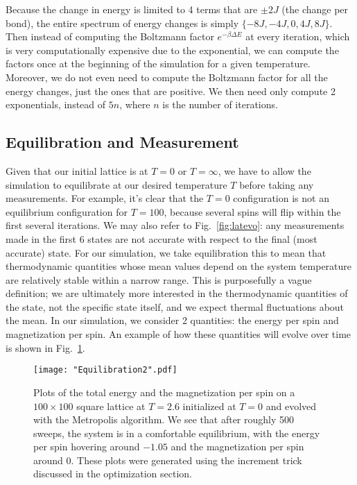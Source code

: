 \documentclass[twocolumn,aps,prl]{revtex4-1} %
\begin{document}
Because the change in energy is limited to 4 terms that are $\pm 2J$ (the change per bond), the entire spectrum of energy changes is simply $\{-8J, -4J, 0, 4J, 8J\}$. Then instead of computing the Boltzmann factor $e^{-\beta\Delta E}$ at every iteration, which is very computationally expensive due to the exponential, we can compute the factors once at the beginning of the simulation for a given temperature. Moreover, we do not even need to compute the Boltzmann factor for all the energy changes, just the ones that are positive. We then need only compute 2 exponentials, instead of $5n$, where $n$ is the number of iterations.

\subsection{Equilibration and Measurement}
Given that our initial lattice is at $T = 0$ or $T = \infty$, we have to allow the simulation to equilibrate at our desired temperature $T$ before taking any measurements. For example, it's clear that the $T = 0$ configuration is not an equilibrium configuration for $T = 100$, because several spins will flip within the first several iterations. We may also refer to Fig.~\ref{fig:latevo}: any measurements made in the first 6 states are not accurate with respect to the final (most accurate) state. For our simulation, we take equilibration this to mean that thermodynamic quantities whose mean values depend on the system temperature are relatively stable within a narrow range. This is purposefully a vague definition; we are ultimately more interested in the thermodynamic quantities of the state, not the specific state itself, and we expect thermal fluctuations about the mean. In our simulation, we consider 2 quantities: the energy per spin and magnetization per spin. An example of how these quantities will evolve over time is shown in Fig.~\ref{fig:equil}. 
\begin{figure}
	\texttt{[image: "Equilibration2".pdf]}
	\caption{\label{fig:equil}Plots of the total energy and the magnetization per spin on a $100 \times 100$ square lattice at $T = 2.6$ initialized at $T = 0$ and evolved with the Metropolis algorithm. We see that after roughly 500 sweeps, the system is in a comfortable equilibrium, with the energy per spin hovering around $-1.05$ and the magnetization per spin around $0$. These plots were generated using the increment trick discussed in the optimization section.}
\end{figure}
\end{document}
